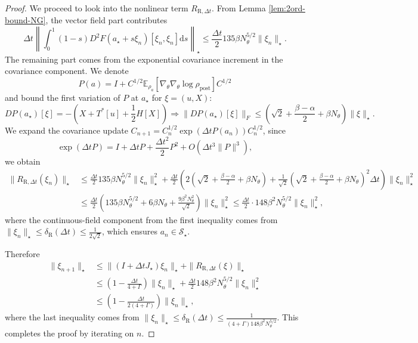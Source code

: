 \documentclass[11pt]{article}
\theoremstyle{plain}
\theoremstyle{definition}
\theoremstyle{remark}
\newcommand{\E}{\mathbb{E}}
\newcommand{\post}{\mathrm{post}}
\newcommand{\dd}{\mathrm{d}}
\begin{document}
\begin{proof}
    We proceed to look into the nonlinear term $R_{\mathrm{R}, \Delta t}$. From Lemma \ref{lem:2ord-bound-NG}, the vector field part contributes
    \begin{equation*}
        \Delta t \left\| \int_0^1 (1 - s) D^2 F(a_\star + s \xi_n) [\xi_n, \xi_n] \dd s \right\|_\star \leq \frac{\Delta t}{2} 135 \beta N_\theta^{5/2} \|\xi_n\|_\star.
    \end{equation*}
    The remaining part comes from the exponential covariance increment in the covariance component. We denote
    \begin{equation*}
        P(a) = I + C^{1/2} \E_{\rho_a} [\nabla_\theta \nabla_\theta \log \rho_\post] C^{1/2}
    \end{equation*}
    and bound the first variation of $P$ at $a_\star$ for $\xi = (u, X)$:
    \begin{equation*}
        DP(a_\star) [\xi] = -\left( X + T^*[u] + \frac{1}{2} H[X] \right) \Longrightarrow \| DP(a_\star) [\xi]\|_F \leq \left( \sqrt{2} + \frac{\beta - \alpha}{2} + \beta N_\theta \right) \|\xi\|_\star.
    \end{equation*}
    We expand the covariance update $C_{n+1} = C_n^{1/2} \exp(\Delta t P(a_n)) C_n^{1/2}$, since \begin{equation*}
        \exp (\Delta t P) = I + \Delta t P + \frac{\Delta t^2}{2} P^2 + O(\Delta t^3 \|P\|^3),
    \end{equation*} 
    we obtain
    \begin{align*}
        \|R_{\mathrm{R}, \Delta t} (\xi_n)\|_\star &\leq \frac{\Delta t}{2} 135 \beta N_\theta^{5/2} \|\xi_n\|_\star^2 + \frac{\Delta t}{2} \left(2 \left( \sqrt{2} + \frac{\beta - \alpha}{2} + \beta N_\theta \right)  + \frac{1}{\sqrt{2}} \left( \sqrt{2} + \frac{\beta - \alpha}{2} + \beta N_\theta \right)^2 \Delta t  \right) \|\xi_n\|_\star^2 \\
        &\leq \frac{\Delta t}{2} \left( 135 \beta N_\theta^{5/2} + 6\beta N_\theta + \frac{9 \beta^2 N_\theta^2}{\sqrt{2}} \right) \|\xi_n\|_\star^2 \leq \frac{\Delta t}{2} \cdot 148 \beta^2 N_\theta^{5/2} \|\xi_n\|_\star^2,
    \end{align*}
    where the continuous-field component from the first inequality comes from $\|\xi_n\|_\star \leq \delta_\mathrm{R} (\Delta t) \leq \frac{1}{2\sqrt{2}}$, which ensures $a_n \in \mathcal{S}_\star$. 
    
    Therefore
    \begin{align*}
        \|\xi_{n+1}\|_\star &\leq \| (I + \Delta t J_\star) \xi_n \|_\star + \|R_{\mathrm{R}, \Delta t} (\xi)\|_\star \\
        &\leq \left( 1 - \frac{\Delta t}{4 + \Gamma} \right) \|\xi_n\|_\star + \frac{\Delta t}{2} 148 \beta^2 N_\theta^{5/2} \|\xi_n\|_\star^2 \\
        &\leq \left( 1 - \frac{\Delta t}{2(4 + \Gamma)} \right) \|\xi_n\|_\star,
    \end{align*}
    where the last inequality comes from $\|\xi_n\|_\star \leq \delta_\mathrm{R} (\Delta t) \leq \frac{1}{(4 + \Gamma) 148 \beta^2 N_\theta^{5/2}}$. This completes the proof by iterating on $n$.
\end{proof}
\end{document}
